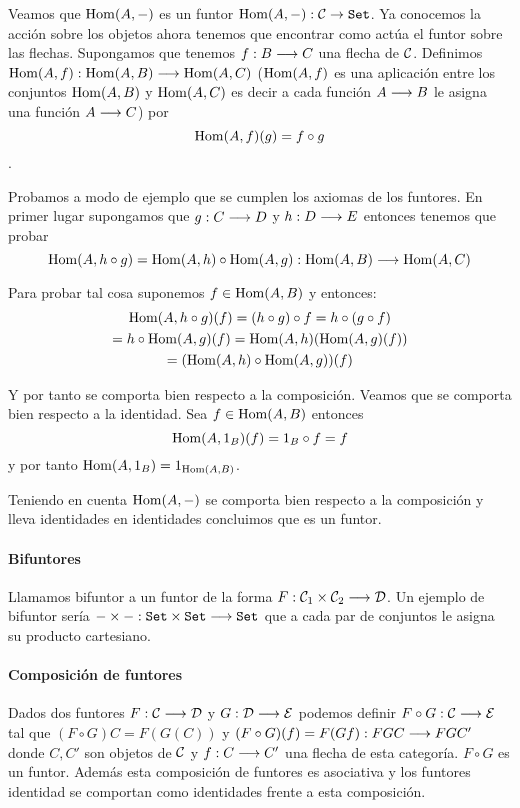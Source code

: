 Veamos que $\operatorname{Hom}(A, -)$ es un funtor
$\operatorname{Hom}(A, -) : \mathcal{C} \rightarrow \texttt{Set}$. Ya conocemos la acción
sobre los objetos ahora tenemos que encontrar como actúa
el funtor sobre las flechas. Supongamos que tenemos
$f : B\longrightarrow C$ una flecha de $\mathcal{C}$. Definimos
$\operatorname{Hom}(A, f) : \operatorname{Hom}(A, B)\longrightarrow \operatorname{Hom}(A, C)$
($\operatorname{Hom}(A, f)$ es una aplicación entre los conjuntos
$\operatorname{Hom}(A, B)$ y $\operatorname{Hom}(A, C)$ es decir a cada función $A\longrightarrow B$
le asigna una función $A\longrightarrow C$) por
$$\operatorname{Hom}(A, f)(g) = f \circ g $$.

Probamos a modo de ejemplo
que se cumplen los axiomas de los funtores. En primer lugar
supongamos que $g : C\longrightarrow D$ y $h : D\longrightarrow E$ entonces tenemos
que probar
$$\operatorname{Hom}(A, h \circ g) = \operatorname{Hom}(A, h) \circ \operatorname{Hom}(A, g) :
\operatorname{Hom}(A, B)\longrightarrow \operatorname{Hom}(A, C)$$

Para probar tal cosa suponemos $f \in \operatorname{Hom}(A, B)$ y entonces:
\begin{multline*}
\operatorname{Hom}(A, h\circ g)(f) = (h \circ g) \circ f = h \circ (g \circ f) \\
= h \circ \operatorname{Hom}(A, g)(f) = \operatorname{Hom}(A, h)(\operatorname{Hom}(A, g)(f)) \\
= (\operatorname{Hom}(A, h) \circ \operatorname{Hom}(A, g))(f)
\end{multline*}

Y por tanto se comporta bien respecto a la composición. Veamos que se
comporta bien respecto a la identidad. Sea $f \in \operatorname{Hom}(A, B)$ entonces
$$\operatorname{Hom}(A, 1_B)(f) = 1_B \circ f = f$$ y por tanto
$\operatorname{Hom}(A, 1_B) = 1_{\operatorname{Hom}(A, B)}$.

Teniendo en cuenta $\operatorname{Hom}(A, -)$ se comporta bien respecto a la
composición y lleva identidades en identidades concluimos que es
un funtor.

\paragraph{Bifuntores}
Llamamos bifuntor a un funtor de
la forma $F : \mathcal{C}_1\times\mathcal{C}_2\longrightarrow \mathcal{D}$. Un ejemplo de
bifuntor sería $-\times - : \texttt{Set}\times\texttt{Set}\longrightarrow \texttt{Set}$ que
a cada par de conjuntos le asigna su producto cartesiano.

\paragraph{Composición de funtores}
Dados dos funtores $F : \mathcal{C}\longrightarrow \mathcal{D}$ y $G: \mathcal{D}\longrightarrow \mathcal{E}$ podemos
definir $F \circ G : \mathcal{C}\longrightarrow \mathcal{E}$ tal que $(F\circ G)C = F(G(C))$
y $(F\circ G)(f) = F(Gf) : FGC\longrightarrow FGC'$ donde $C, C'$ son objetos
de $\mathcal{C}$ y $f: C\longrightarrow C'$ una flecha de esta categoría. $F\circ G$
es un funtor. Además esta composición de funtores es asociativa
y los funtores identidad se comportan como identidades frente
a esta composición.

